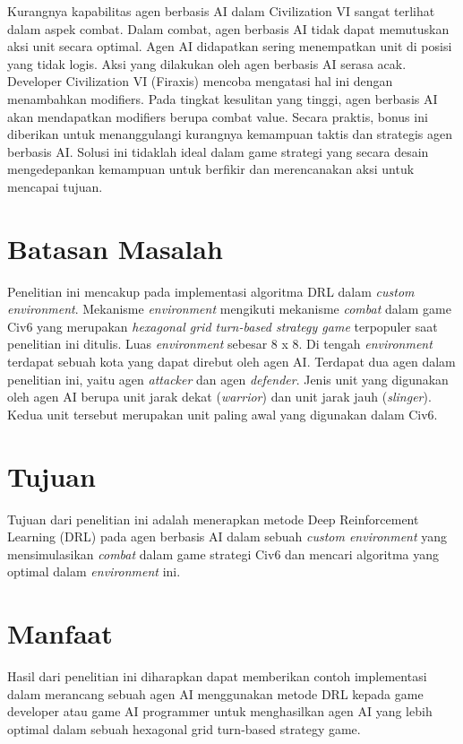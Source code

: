 Kurangnya kapabilitas agen berbasis AI dalam Civilization VI sangat terlihat dalam aspek combat. Dalam combat, agen berbasis AI tidak dapat memutuskan aksi unit secara optimal. Agen AI didapatkan sering menempatkan unit di posisi yang tidak logis. Aksi yang dilakukan oleh agen berbasis AI serasa acak. Developer Civilization VI (Firaxis) mencoba mengatasi hal ini dengan menambahkan modifiers. Pada tingkat kesulitan yang tinggi, agen berbasis AI akan mendapatkan modifiers berupa combat value. Secara praktis, bonus ini diberikan untuk menanggulangi kurangnya kemampuan taktis dan strategis agen berbasis AI. Solusi ini tidaklah ideal dalam game strategi yang secara desain mengedepankan kemampuan untuk berfikir dan merencanakan aksi untuk mencapai tujuan.

\section{Batasan Masalah}
\label{sec:batasanmasalah}

Penelitian ini mencakup pada implementasi algoritma DRL dalam \emph{custom environment}. 
Mekanisme \emph{environment} mengikuti mekanisme \emph{combat} dalam game Civ6 yang merupakan \emph{hexagonal grid turn-based strategy game} terpopuler saat penelitian ini ditulis. 
Luas \emph{environment} sebesar 8 x 8. Di tengah \emph{environment} terdapat sebuah kota yang dapat direbut oleh agen AI. Terdapat dua agen dalam penelitian ini, yaitu agen \emph{attacker} dan agen \emph{defender}. 
Jenis unit yang digunakan oleh agen AI berupa unit jarak dekat (\emph{warrior}) dan unit jarak jauh (\emph{slinger}). Kedua unit tersebut merupakan unit paling awal yang digunakan dalam Civ6.

\section{Tujuan}
\label{sec:Tujuan}

Tujuan dari penelitian ini adalah menerapkan metode Deep Reinforcement Learning (DRL) pada agen berbasis AI dalam sebuah \emph{custom environment} yang mensimulasikan \emph{combat} dalam game strategi Civ6 dan mencari algoritma yang optimal dalam \emph{environment} ini. 

\section{Manfaat}
\label{sec:manfaat}

Hasil dari penelitian ini diharapkan dapat memberikan contoh implementasi dalam merancang sebuah agen AI menggunakan metode DRL kepada game developer atau game AI programmer untuk menghasilkan agen AI yang lebih optimal dalam sebuah hexagonal grid turn-based strategy game.

